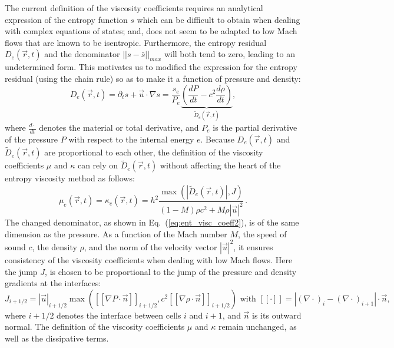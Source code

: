 \documentclass[12pt]{article}
\newcommand{\eqt}[1]{Eq.~(\ref{#1})} %
\begin{document}
The current definition of the viscosity coefficients requires an analytical expression of the entropy function $s$ which can be difficult to obtain when dealing with complex equations of states; and, does not seem to be adapted to low Mach flows that are known to be isentropic. Furthermore, the entropy residual $D_e(\vec{r},t)$ and the denominator $|| s - \bar{s} ||_{max}$ will both tend to zero, leading to an undetermined form. This motivates us to modified the expression for the entropy residual (using the chain rule) so as to make it a function of pressure and  density: 
\begin{equation}
\label{eq:new_ent_res}
D_e(\vec{r},t) = \partial_t s + \vec{u} \cdot \nabla s = \frac{s_e}{P_e} \underbrace{\left( \frac{d P}{dt} - c^2 \frac{d \rho}{dt} \right)}_{\tilde{D}_e(\vec{r},t)},
\end{equation}
where $\frac{d \cdot}{dt}$ denotes the material or total derivative, and $P_e$ is the partial derivative of the pressure $P$ with respect to the internal energy $e$. Because $D_e(\vec{r},t)$ and $\tilde{D}_e(\vec{r},t)$ are proportional to each other, the definition of the viscosity coefficients $\mu$ and $\kappa$ can rely on $\tilde{D}_e(\vec{r},t)$ without affecting the heart of the entropy viscosity method as follows: 
\begin{equation}
\label{eq:ent_visc_coeff2}
\mu_e(\vec{r},t) = \kappa_e(\vec{r},t) = h^2 \frac{\max\left( | \tilde{D}_e(\vec{r},t) |, J \right)}{(1-M) \rho c^2 + M \rho |\vec{u}|^2} \,.
\end{equation}
The changed denominator, as shown in \eqt{eq:ent_visc_coeff2}, is of the same dimension as the pressure. As a function of the Mach number $M$, the speed of sound $c$, the density $\rho$, and the norm of the velocity vector $|\vec{u}|^2$, it ensures consistency of the viscosity coefficients when dealing with low Mach flows. Here the jump $J$,  is chosen to be proportional to the jump of the pressure and density gradients at the interfaces:
\begin{equation}
\label{eq:equation23}
J_{i+1/2} = |\vec{u}|_{i+1/2} \max \left( [[ \nabla P \cdot \vec{n} ]]_{i+1/2}, c^2 [[ \nabla \rho \cdot \vec{n} ]]_{i+1/2} \right) \text{ with } [[ \cdot ]] = |(\nabla \cdot)_i -  (\nabla \cdot)_{i+1}| \cdot \vec{n},
\end{equation}
where $i+1/2$ denotes the interface between cells $i$ and $i+1$, and $\vec{n}$ is its outward normal.
The definition of the viscosity coefficients $\mu$ and $\kappa$ remain unchanged, as well as the dissipative terms.
\end{document}
